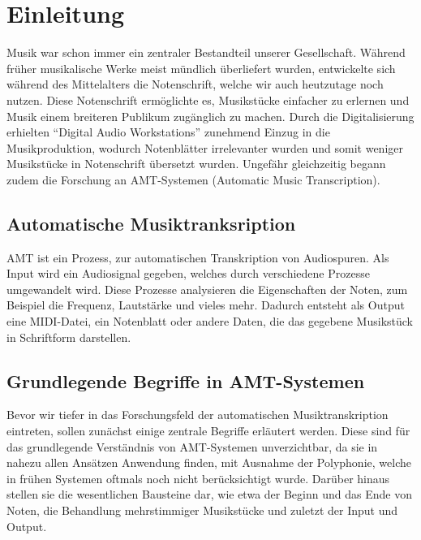 \section{Einleitung}
Musik war schon immer ein zentraler Bestandteil unserer Gesellschaft.
Während früher musikalische Werke meist mündlich überliefert wurden,
entwickelte sich während des Mittelalters die Notenschrift, welche wir auch heutzutage noch nutzen.
Diese Notenschrift ermöglichte es, Musikstücke einfacher zu erlernen und Musik einem breiteren Publikum zugänglich zu machen.
Durch die Digitalisierung erhielten \enquote{Digital Audio Workstations} zunehmend Einzug in die Musikproduktion,
wodurch Notenblätter irrelevanter wurden und somit weniger Musikstücke in Notenschrift übersetzt wurden.
Ungefähr gleichzeitig begann zudem die Forschung an AMT-Systemen (Automatic Music Transcription).

\subsection{Automatische Musiktranksription}
AMT ist ein Prozess, zur automatischen Transkription von Audiospuren.
Als Input wird ein Audiosignal gegeben, welches durch verschiedene Prozesse umgewandelt wird.
Diese Prozesse analysieren die Eigenschaften der Noten, zum Beispiel die Frequenz, Lautstärke und vieles mehr.
Dadurch entsteht als Output eine MIDI-Datei, ein Notenblatt oder andere Daten,
die das gegebene Musikstück in Schriftform darstellen.

\subsection{Grundlegende Begriffe in AMT-Systemen}
Bevor wir tiefer in das Forschungsfeld der automatischen Musiktranskription eintreten,
sollen zunächst einige zentrale Begriffe erläutert werden.
Diese sind für das grundlegende Verständnis von AMT-Systemen unverzichtbar,
da sie in nahezu allen Ansätzen Anwendung finden, mit Ausnahme der Polyphonie,
welche in frühen Systemen oftmals noch nicht berücksichtigt wurde.
Darüber hinaus stellen sie die wesentlichen Bausteine dar,
wie etwa der Beginn und das Ende von Noten, die Behandlung mehrstimmiger Musikstücke und zuletzt der Input und Output.

